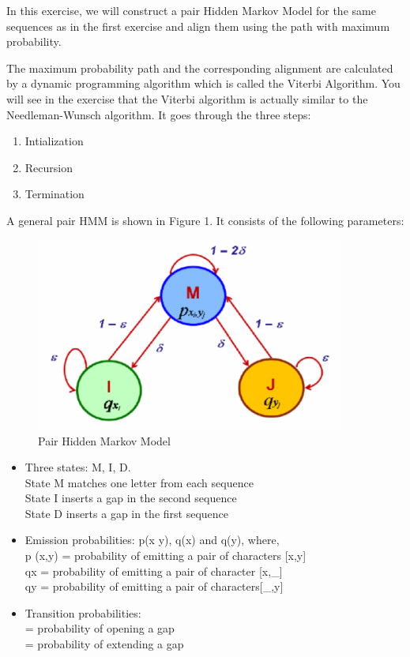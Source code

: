 \documentclass[a4paper,11pt]{article}
\DeclareRobustCommand{\greektext}{%
  \fontencoding{LGR}\selectfont\def\encodingdefault{LGR}}
\DeclareRobustCommand{\textgreek}[1]{\leavevmode{\greektext #1}}
\begin{document}
In this exercise, we will construct a pair Hidden Markov Model for
the same sequences as in the first exercise and align them using the
path with maximum probability.

The maximum probability path and the corresponding alignment are calculated by a dynamic
programming algorithm which is called the Viterbi Algorithm. You will
see in the exercise that the Viterbi algorithm is actually similar
to the Needleman-Wunsch algorithm. It goes through the three steps:
\begin{enumerate}
\item Intialization
\item Recursion
\item Termination
\end{enumerate}

A general pair HMM is shown in Figure 1. It consists of the following parameters:
\begin{figure}
\begin{centering}
\includegraphics[width=4in]{HMMfigures.eps}\caption{Pair Hidden Markov Model}
\par\end{centering}
\end{figure}

\begin{itemize}
\item Three states: M, I, D.\\
State M matches one letter from each sequence\\
State I inserts a gap in the second sequence \\
State D inserts a gap in the first sequence

\item Emission probabilities: p(x y), q(x) and q(y), where,\\
p (x,y) = probability of emitting a pair of characters {[}x,y{]} \\
qx = probability of emitting a pair of character {[}x,\_{]}\\
qy = probability of emitting a pair of characters{[}\_,y{]}

\item Transition probabilities:\\
\textgreek{d} = probability of opening a gap \\
\textgreek{e} = probability of extending a gap \\
\end{itemize}
\end{document}
